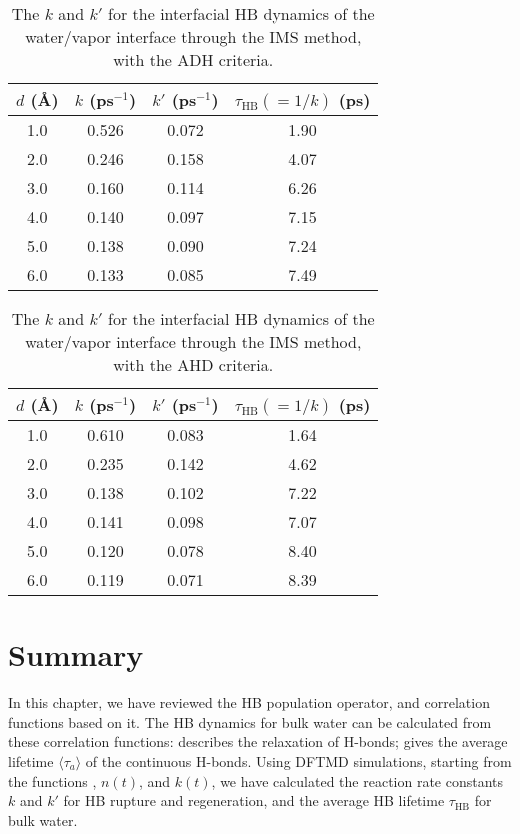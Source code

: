 \begin{table}[H]
\centering
\caption{\label{tab:k_k_prime_tau_128w_pure_ihb_scheme1_ADH} 
    The $k$ and $k'$ for the interfacial HB dynamics of the water/vapor interface through the IMS method, with the ADH criteria.} 
\begin{tabular}{cccc}
 $d$ (\AA) & $k$ (ps$^{-1}$) & $k'$ (ps$^{-1}$) & $\tau_{\text{HB}} (=1/k)$ (ps) \\
\hline
  1.0 & 0.526 & 0.072 & 1.90  \\
  2.0 & 0.246 & 0.158 & 4.07  \\
  3.0 & 0.160 & 0.114 & 6.26  \\
  4.0 & 0.140 & 0.097 & 7.15  \\
  5.0 & 0.138 & 0.090 & 7.24  \\
  6.0 & 0.133 & 0.085 & 7.49  \\
\end{tabular}
\end{table}
\begin{table}[H]
\centering
\caption{\label{tab:k_k_prime_tau_128w_pure_ihb_AHD} 
    The $k$ and $k'$ for the interfacial HB dynamics of the water/vapor interface through the IMS method, with the AHD criteria.} 
\begin{tabular}{cccc}
 $d$ (\AA) & $k$ (ps$^{-1}$) & $k'$ (ps$^{-1}$) & $\tau_{\text{HB}} (=1/k)$ (ps) \\
\hline
  1.0 & 0.610 & 0.083 & 1.64  \\
  2.0 & 0.235 & 0.142 & 4.62  \\
  3.0 & 0.138 & 0.102 & 7.22  \\
  4.0 & 0.141 & 0.098 & 7.07  \\
  5.0 & 0.120 & 0.078 & 8.40  \\
  6.0 & 0.119 & 0.071 & 8.39  \\
\end{tabular}
\end{table}

\section{Summary}
In this chapter, we have reviewed the HB population operator, 
and correlation functions based on it. 
The HB dynamics for bulk water can be calculated from these correlation functions: 
\CHB describes the relaxation of H-bonds; \SHB gives the average lifetime $\langle \tau_a \rangle$ of the continuous H-bonds. 
Using DFTMD simulations, starting from the functions \CHB, $n(t)$, and $k(t)$, 
we have calculated the reaction rate constants $k$ and $k'$ for HB rupture and regeneration, and the average HB lifetime $\tau_{\text{HB}}$ for bulk water.


